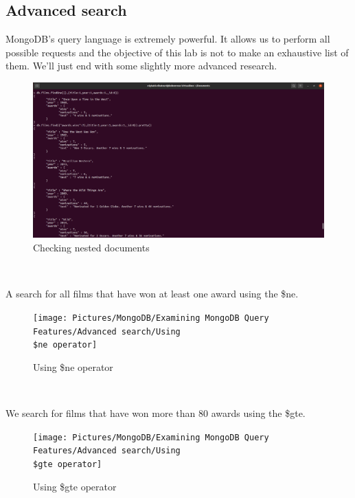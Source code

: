 \begin{spacing}{0.9}
\section{Advanced search }
\par MongoDB's query language is extremely powerful. It allows us to perform all
possible requests and the objective of this lab is not to make an exhaustive list of them. We'll just
end with some slightly more advanced research.
\\
\begin{figure}[!htb] 
\begin{center} 
\includegraphics[width=1\linewidth]{Pictures/MongoDB/Examining MongoDB Query Features/Advanced search/Checking nested documents} 
\end{center} 
\caption{Checking nested documents} 
\end{figure}  \FloatBarrier
\\

\par A search for all films that have won at least one award using the \$ne.
\\
\begin{figure}[!htb] 
\begin{center} 
\texttt{[image: Pictures/MongoDB/Examining MongoDB Query Features/Advanced search/Using \\\$ne operator]} 
\end{center} 
\caption{Using \$ne operator} 
\end{figure}  \FloatBarrier
\\
\newpage
\par We search for films that have won more than 80 awards using the \$gte.
\\
\begin{figure}[!htb] 
\begin{center} 
\texttt{[image: Pictures/MongoDB/Examining MongoDB Query Features/Advanced search/Using \\\$gte operator]} 
\end{center} 
\caption{Using \$gte operator} 
\end{figure}  \FloatBarrier
\\


\end{spacing}
